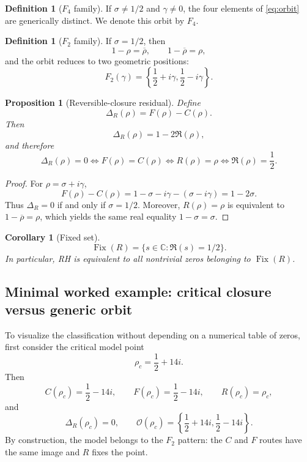 \documentclass[11pt]{amsart}
\newtheorem{proposition}[theorem]{Proposition}
\newtheorem{corollary}[theorem]{Corollary}
\theoremstyle{definition}
\newtheorem{definition}[theorem]{Definition}
\theoremstyle{remark}
\begin{document}
\begin{definition}[$F_4$ family]
If $\sigma\neq1/2$ and $\gamma\neq0$, the four elements of \eqref{eq:orbit} are generically distinct. We denote this orbit by $F_4$.
\end{definition}

\begin{definition}[$F_2$ family]
If $\sigma=1/2$, then
\begin{equation}\label{eq:F2collapse}
  1-\rho=\overline\rho,\qquad 1-\overline\rho=\rho,
\end{equation}
and the orbit reduces to two geometric positions:
\begin{equation}
 F_2(\gamma)=\left\{\frac12+i\gamma,\frac12-i\gamma\right\}.
\end{equation}
\end{definition}

\begin{proposition}[Reversible-closure residual]\label{prop:residual}
Define
\begin{equation}\label{eq:delta}
 \Delta_R(\rho)=F(\rho)-C(\rho).
\end{equation}
Then
\begin{equation}\label{eq:deltaeval}
 \Delta_R(\rho)=1-2\Re(\rho),
\end{equation}
and therefore
\begin{equation}\label{eq:equiv}
 \Delta_R(\rho)=0
 \iff F(\rho)=C(\rho)
 \iff R(\rho)=\rho
 \iff \Re(\rho)=\frac12.
\end{equation}
\end{proposition}

\begin{proof}
For $\rho=\sigma+i\gamma$,
\[
F(\rho)-C(\rho)=1-\sigma-i\gamma-(\sigma-i\gamma)=1-2\sigma.
\]
Thus $\Delta_R=0$ if and only if $\sigma=1/2$. Moreover, $R(\rho)=\rho$ is equivalent to $1-\overline\rho=\rho$, which yields the same real equality $1-\sigma=\sigma$.
\end{proof}

\begin{corollary}[Fixed set]
\begin{equation}
 \operatorname{Fix}(R)=\{s\in\mathbb C:\Re(s)=1/2\}.
\end{equation}
In particular, RH is equivalent to all nontrivial zeros belonging to $\operatorname{Fix}(R)$.
\end{corollary}

\subsection{Minimal worked example: critical closure versus generic orbit}\label{sec:workedexample}
To visualize the classification without depending on a numerical table of zeros, first consider the critical model point
\[
\rho_c=\frac12+14i.
\]
Then
\[
C(\rho_c)=\frac12-14i,\qquad F(\rho_c)=\frac12-14i,\qquad R(\rho_c)=\rho_c,
\]
and
\[
\Delta_R(\rho_c)=0,
\qquad
\mathcal O(\rho_c)=\left\{\frac12+14i,\frac12-14i\right\}.
\]
By construction, the model belongs to the $F_2$ pattern: the $C$ and $F$ routes have the same image and $R$ fixes the point.
\end{document}
